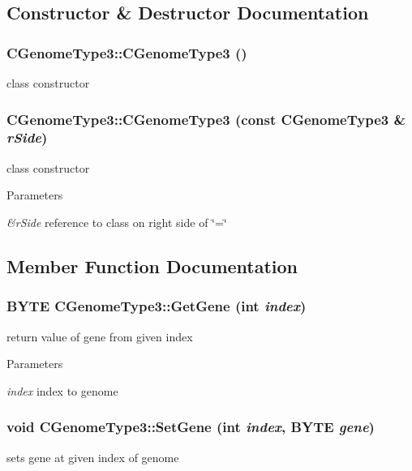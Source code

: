 \subsection{Constructor \& Destructor Documentation}
\hypertarget{classCGenomeType3_a4bf9f000ce756d3203a754f7eaf29634}{
\subsubsection[{CGenomeType3}]{\setlength{\rightskip}{0pt plus 5cm}CGenomeType3::CGenomeType3 ()}}
\label{classCGenomeType3_a4bf9f000ce756d3203a754f7eaf29634}
class constructor \hypertarget{classCGenomeType3_a6175c7fcb882b942df799420b7b86f66}{
\subsubsection[{CGenomeType3}]{\setlength{\rightskip}{0pt plus 5cm}CGenomeType3::CGenomeType3 (const {\bf CGenomeType3} \& {\em rSide})}}
\label{classCGenomeType3_a6175c7fcb882b942df799420b7b86f66}
class constructor


\begin{DoxyParams}{Parameters}
\item[{\em \&rSide}]reference to class on right side of \char`\"{}=\char`\"{} \end{DoxyParams}


\subsection{Member Function Documentation}
\hypertarget{classCGenomeType3_af6f7a0271f5b93dbf23f030b3cb7781f}{
\subsubsection[{GetGene}]{\setlength{\rightskip}{0pt plus 5cm}BYTE CGenomeType3::GetGene (int {\em index})}}
\label{classCGenomeType3_af6f7a0271f5b93dbf23f030b3cb7781f}
return value of gene from given index


\begin{DoxyParams}{Parameters}
\item[{\em index}]index to genome \end{DoxyParams}
\hypertarget{classCGenomeType3_a3d0626b0e86222aa39563642530d7ab0}{
\subsubsection[{SetGene}]{\setlength{\rightskip}{0pt plus 5cm}void CGenomeType3::SetGene (int {\em index}, \/  BYTE {\em gene})}}
\label{classCGenomeType3_a3d0626b0e86222aa39563642530d7ab0}
sets gene at given index of genome


